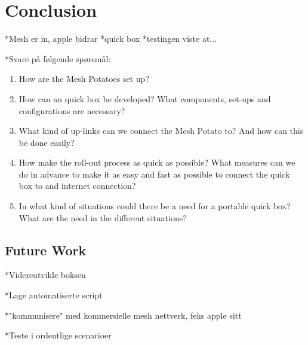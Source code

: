 \chapter{Conclusion}
\label{chp:conclusion} 
*Mesh er in, apple bidrar
*quick box 
*testingen viste at...

*Svare på følgende spørsmål:
\begin{enumerate}
\item How are the Mesh Potatoes set up? 
\item How can an \gls{quick} box be developed? What components, set-ups and configurations are necessary?
\item What kind of up-links can we connect the Mesh Potato to? And how can this be done easily? 
\item How make the roll-out process as quick as possible? What measures can we do in advance to make it as easy and fast as possible to connect the \gls{quick} box to and internet connection?
\item In what kind of situations could there be a need for a portable \gls{quick} box? What are the need in the different situations?
\end{enumerate}

\section{Future Work}

*Videreutvikle boksen

*Lage automatiserte script

*"kommunisere" med kommersielle mesh nettverk, feks apple sitt

*Teste i ordentlige scenarioer 